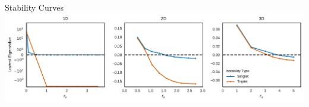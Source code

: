 \documentclass[10pt]{beamer}
\begin{document}
{{{{{{{{

{%
\begin{frame}{Stability Curves}
  \vspace{-0.5in}
	\includegraphics[width=\linewidth]{../figures/stability.pdf}
\end{frame}

}}}}}}}}}
\end{document}
